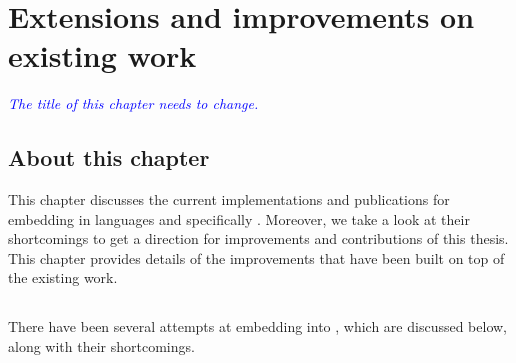\documentclass[thesis-solanki.tex]{subfiles}
\begin{document}
\chapter{Extensions and improvements on existing work}\label{chap:proposedWork}

\textcolor{blue}{\textsl{The title of this chapter needs to change.}}

\section{About this chapter}\label{sec:what-this-chapter:proposedWork}

\begin{comment}
This chapter discusses the current work in done in embedding programming languages.
Specifically speaking embedding \progLang{Prolog} in \progLang{Haskell}.
We analyze the current implementations and provide insights into the contributions of this thesis.
\end{comment}
This chapter discusses the current implementations and publications for embedding  in languages
and specifically . Moreover, we take a look at their shortcomings to get a direction for improvements and contributions 
of this thesis. This chapter provides details of the improvements that have been built on top of the existing work.


\section{} \label{sec:existing-work-by-others}

There have been several attempts at embedding  into , which are
discussed below, along with their shortcomings.
\end{document}

